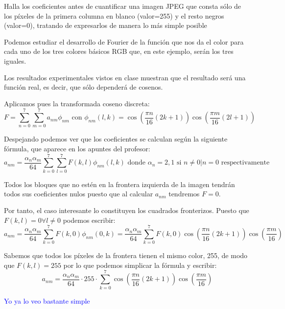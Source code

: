 \begin{problem}[7]
Halla los coeficientes antes de cuantificar una imagen JPEG que consta sólo de los píxeles de la primera columna en blanco (valor=255) y el resto negros (valor=0), tratando de expresarlos de manera lo más simple posible
\solution

\yoP

Podemos estudiar el desarrollo de Fourier de la función que nos da el color para cada uno de los tres colores básicos RGB que, en este ejemplo, serán los tres iguales.

Los resultados experimentales vistos en clase muestran que el resultado será una función real, es decir, que sólo dependerá de cosenos.

Aplicamos pues la transformada coseno discreta:
\[F=\sum_{n=0}^7\sum_{m=0}^7 a_{nm}\phi_{nm} \text{ con } \phi_{nm}(l,k)=\cos\left(\frac{πn}{16}(2k+1) \right) \cos\left( \frac{πm}{16}(2l+1)\right)\]

Despejando podemos ver que los coeficientes se calculan según la siguiente fórmula, que aparece en los apuntes del profesor:
\[a_{nm}=\frac{α_nα_m}{64}\sum_{k=0}^7\sum_{l=0}^7F(k,l) \phi_{nm}(l,k) \text{ donde } α_n=2,1 \text{ si } n\neq0 | n = 0 \text{ respectivamente}\]

Todos los bloques que no estén en la frontera izquierda de la imagen tendrán todos sus coeficientes nulos puesto que al calcular $a_{nm}$ tendremos $F=0$.

Por tanto, el caso interesante lo constituyen los cuadrados fronterizos. Puesto que $F(k,l)=0 \forall l\neq 0$ podemos escribir:
\[a_{nm} = \frac{α_nα_m}{64}\sum_{k=0}^7F(k,0)\phi_{nm}(0,k)=\frac{α_nα_m}{64}\sum_{k=0}^7F(k,0)\cos\left(\frac{πn}{16}(2k+1) \right) \cos\left( \frac{πm}{16}\right)\]

Sabemos que todos los píxeles de la frontera tienen el mismo color, 255, de modo que $F(k,l)=255$ por lo que podemos simplicar la fórmula y escribir:
\[a_{nm}=\frac{α_nα_m}{64}\cdot 255 \cdot \sum_{k=0}^7\cos\left(\frac{πn}{16}(2k+1) \right) \cos\left( \frac{πm}{16}\right)\]

\textcolor{blue}{Yo ya lo veo bastante simple}

\end{problem}

